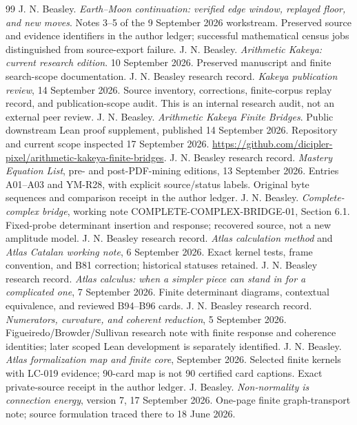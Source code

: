 \documentclass[11pt,letterpaper]{article}
\theoremstyle{definition}
\theoremstyle{remark}\newtheorem{remark}[theorem]{Remark}
\begin{document}
\begin{thebibliography}{99}
 J. N. Beasley. \emph{Earth--Moon continuation: verified edge window, replayed floor, and new moves}. Notes 3--5 of the 9 September 2026 workstream. Preserved source and evidence identifiers in the author ledger; successful mathematical census jobs distinguished from source-export failure.
 J. N. Beasley. \emph{Arithmetic Kakeya: current research edition}. 10 September 2026. Preserved manuscript and finite search-scope documentation.
 J. N. Beasley research record. \emph{Kakeya publication review}, 14 September 2026. Source inventory, corrections, finite-corpus replay record, and publication-scope audit. This is an internal research audit, not an external peer review.
 J. N. Beasley. \emph{Arithmetic Kakeya Finite Bridges}. Public downstream Lean proof supplement, published 14 September 2026. Repository and current scope inspected 17 September 2026. \url{https://github.com/dicipler-pixel/arithmetic-kakeya-finite-bridges}.
 J. N. Beasley research record. \emph{Mastery Equation List}, pre- and post-PDF-mining editions, 13 September 2026. Entries A01--A03 and YM-R28, with explicit source/status labels. Original byte sequences and comparison receipt in the author ledger.
 J. N. Beasley. \emph{Complete-complex bridge}, working note COMPLETE-COMPLEX-BRIDGE-01, Section 6.1. Fixed-probe determinant insertion and response; recovered source, not a new amplitude model.
 J. N. Beasley research record. \emph{Atlas calculation method} and \emph{Atlas Catalan working note}, 6 September 2026. Exact kernel tests, frame convention, and B81 correction; historical statuses retained.
 J. N. Beasley research record. \emph{Atlas calculus: when a simpler piece can stand in for a complicated one}, 7 September 2026. Finite determinant diagrams, contextual equivalence, and reviewed B94--B96 cards.
 J. N. Beasley research record. \emph{Numerators, curvature, and coherent reduction}, 5 September 2026. Figueiredo/Browder/Sullivan research note with finite response and coherence identities; later scoped Lean development is separately identified.
 J. N. Beasley. \emph{Atlas formalization map and finite core}, September 2026. Selected finite kernels with LC-019 evidence; 90-card map is not 90 certified card captions. Exact private-source receipt in the author ledger.
 J. Beasley. \emph{Non-normality is connection energy}, version 7, 17 September 2026. One-page finite graph-transport note; source formulation traced there to 18 June 2026.

\end{thebibliography}
\end{document}
